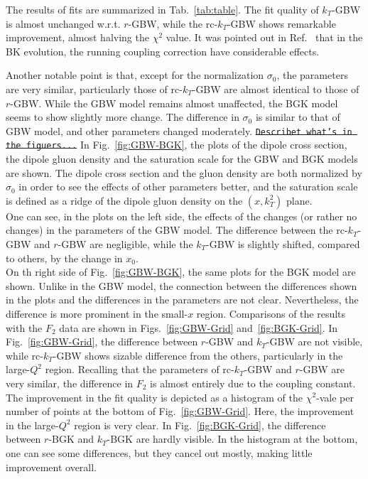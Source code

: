\documentclass[11pt]{article}
\numberwithin{equation}{section}
\numberwithin{table}{section}
\numberwithin{figure}{section}
\newcommand{\comment}[1]{\texttt{\color{red}#1}}
\begin{document}
The results of fits are summarized in Tab.~\ref{tab:table}. 
The fit quality of $k_T$-GBW is almost unchanged w.r.t. $r$-GBW, while the rc-$k_T$-GBW shows remarkable improvement, almost halving the $\chi^2$ value.
It was pointed out in Ref.~\cite{Albacete:2004gw,Albacete:2007yr,Albacete:2010sy} that in the BK evolution, the running coupling correction have considerable effects.

Another notable point is that, except for the normalization $\sigma_0$, the parameters are very similar, particularly those of rc-$k_T$-GBW are almost identical to those of $r$-GBW. 
While the GBW model remains almost unaffected, the BGK model seems to show slightly more change. The difference in $\sigma_0$ is similar to that of GBW model, and other parameters changed moderately.
\sout{\comment{Describet what's in the figuers...} }
In Fig.~\ref{fig:GBW-BGK}, the plots of the dipole cross section, the dipole gluon density and the saturation scale for the GBW and BGK models are shown. The dipole cross section and the gluon density are both normalized by $\sigma_0$ in order to see the effects  of other parameters better,
and the saturation scale is defined as a ridge of the dipole gluon density on the $(x,k_T^2)$ plane.\\
One can see, in the plots on the left side, the effects of the changes (or rather no changes) in the parameters of the GBW model. The difference between the rc-$k_T$-GBW and $r$-GBW are negligible, while the $k_T$-GBW is slightly shifted, compared to others, by the change in $x_0$.\\
On th right side of Fig.~\ref{fig:GBW-BGK}, the same plots for the BGK model are shown.
Unlike in the GBW model, the connection between the differences shown in the plots and the differences in the parameters are not clear. Nevertheless, the difference is more prominent in the small-$x$ region.
Comparisons of the results with the $F_2$ data are shown in Figs.~\ref{fig:GBW-Grid} and~\ref{fig:BGK-Grid}.
In Fig.~\ref{fig:GBW-Grid}, the difference between $r$-GBW and $k_T$-GBW are not visible, while rc-$k_T$-GBW shows sizable difference from the others, particularly in the large-$Q^2$ region. 
Recalling that the parameters of rc-$k_T$-GBW and $r$-GBW are very similar, the difference in $F_2$ is almost entirely due to the coupling constant. The improvement in the fit quality is depicted as a histogram of the $\chi^2$-vale per number of points at the bottom of Fig.~\ref{fig:GBW-Grid}. Here, the improvement in the large-$Q^2$ region is very clear.
In Fig.~\ref{fig:BGK-Grid}, the difference between $r$-BGK and $k_T$-BGK are hardly visible. In the histogram at the bottom, one can see some differences, but they cancel out mostly, making little improvement overall.
\end{document}
